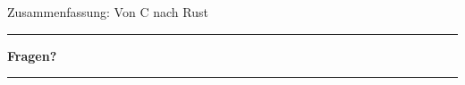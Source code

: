 \documentclass[%
  aspectratio=169,
  10pt
]{beamer}
\begin{document}
\begin{frame}{Zusammenfassung: Von C nach Rust}
  \vspace{0.4em}
  \begin{center}
    \large\color{fbblau}\rule{0.4\textwidth}{0.4pt}\quad
    \textbf{Fragen?}
    \quad\rule{0.4\textwidth}{0.4pt}
  \end{center}
\end{frame}

\end{document}
